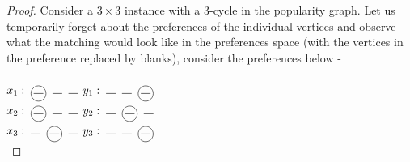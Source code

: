 \documentclass[a4paper,10pt]{article}
\theoremstyle{plain} %
\theoremstyle{plain} %
\newcommand*\circled[1]{\tikz[baseline=(char.base)]{
            \node[shape=circle,draw,inner sep=2pt] (char) {#1};}}
\begin{document}
\begin{proof}
    Consider a $3 \times 3$ instance with a 3-cycle in the popularity graph. Let us temporarily forget about the preferences of the individual vertices and observe what the matching would look like in the preferences space (with the vertices in the preference replaced by blanks), consider the preferences below - \\ \\
    $x_1: \; \circled{\rule{0.3cm}{0.15mm}} \; \; \rule{0.3cm}{0.15mm} \; \; \rule{0.3cm}{0.15mm}$ \phantom{This text will be invisible} $y_1: \; \rule{0.3cm}{0.15mm} \; \; \rule{0.3cm}{0.15mm} \; \; \circled{\rule{0.3cm}{0.15mm}}$ \\
    $x_2: \; \circled{\rule{0.3cm}{0.15mm}} \; \; \rule{0.3cm}{0.15mm} \; \; \rule{0.3cm}{0.15mm}$ \phantom{This text will be invisible} $y_2: \; \rule{0.3cm}{0.15mm} \; \; \circled{\rule{0.3cm}{0.15mm}} \; \; \rule{0.3cm}{0.15mm}$ \\
    $x_3: \; \rule{0.3cm}{0.15mm} \; \; \circled{\rule{0.3cm}{0.15mm}} \; \; \rule{0.3cm}{0.15mm}$ \phantom{This text will be invisible} $y_3: \; \rule{0.3cm}{0.15mm} \; \; \rule{0.3cm}{0.15mm} \; \; \circled{\rule{0.3cm}{0.15mm}}$ \\


\end{proof}
\end{document}
